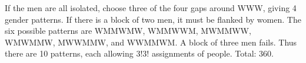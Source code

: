 If the men are all isolated, choose three of the four gaps around WWW, giving 4 gender patterns. If there is a block of two men, it must be flanked by women. The six possible patterns are WMMWMW, WMMWWM, MWMMWW, WMWMMW, MWWMMW, and WWMMWM. A block of three men fails. Thus there are 10 patterns, each allowing $3!3!$ assignments of people. Total: $\boxed{360}$.
